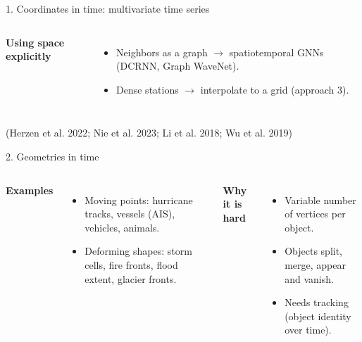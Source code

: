 \documentclass{beamer}
\begin{document}
\begin{frame}{1. Coordinates in time: multivariate time series}
\begin{columns}[t]
        \textbf{Using space explicitly}
        \begin{itemize}
            \item Neighbors as a graph $\rightarrow$ spatiotemporal GNNs (DCRNN, Graph WaveNet).
            \item Dense stations $\rightarrow$ interpolate to a grid (approach 3).
        \end{itemize}
    \end{columns}

    \vfill
    \hfill{\tiny (Herzen et al. 2022; Nie et al. 2023; Li et al. 2018; Wu et al. 2019)}
\end{frame}

\begin{frame}{2. Geometries in time}
    \centering

    \scriptsize
    \begin{columns}[t]
        \textbf{Examples}
        \begin{itemize}
            \item Moving points: hurricane tracks, vessels (AIS), vehicles, animals.
            \item Deforming shapes: storm cells, fire fronts, flood extent, glacier fronts.
        \end{itemize}

        \textbf{Why it is hard}
        \begin{itemize}
            \item Variable number of vertices per object.
            \item Objects split, merge, appear and vanish.
            \item Needs tracking (object identity over time).
        \end{itemize}


\end{columns}
\end{frame}
\end{document}
